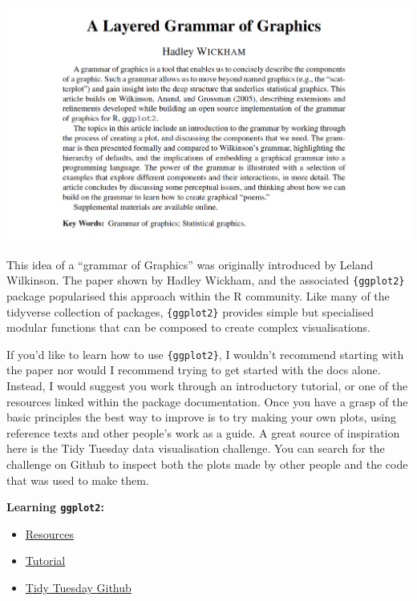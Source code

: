 \documentclass[
  12pt,
]{book}
\providecommand{\tightlist}{%
  \setlength{\itemsep}{0pt}\setlength{\parskip}{0pt}}
\begin{document}
\includegraphics{images/303-data-visualisation/grammar-of-graphics-abstract.png}

This idea of a ``grammar of Graphics'' was originally introduced by Leland Wilkinson. The paper shown by Hadley Wickham, and the associated \texttt{\{ggplot2\}} package popularised this approach within the R community. Like many of the tidyverse collection of packages, \texttt{\{ggplot2\}} provides simple but specialised modular functions that can be composed to create complex visualisations.

If you'd like to learn how to use \texttt{\{ggplot2\}}, I wouldn't recommend starting with the paper nor would I recommend trying to get started with the docs alone. Instead, I would suggest you work through an introductory tutorial, or one of the resources linked within the package documentation. Once you have a grasp of the basic principles the best way to improve is to try making your own plots, using reference texts and other people's work as a guide. A great source of inspiration here is the Tidy Tuesday data visualisation challenge. You can search for the challenge on Github to inspect both the plots made by other people and the code that was used to make them.

\textbf{Learning \texttt{ggplot2}:}

\begin{itemize}
\tightlist
\item
  \href{https://ggplot2.tidyverse.org/\#learning-ggplot2}{Resources}
\item
  \href{https://www.cedricscherer.com/2019/08/05/a-ggplot2-tutorial-for-beautiful-plotting-in-r/}{Tutorial}
\item
  \href{https://github.com/search?p=1\&q=tidy+tuesday\&type=Repositories}{Tidy Tuesday Github}
\end{itemize}
\end{document}
